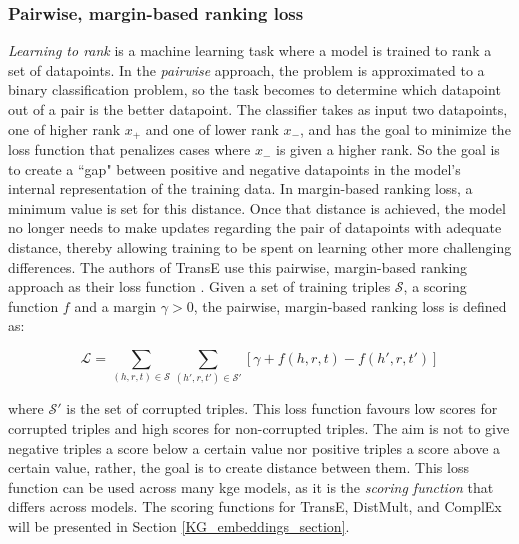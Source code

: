 \subsubsection{Pairwise, margin-based ranking loss}
\textit{Learning to rank} is a machine learning task where a model is trained to rank a set of datapoints. In the \textit{pairwise} approach, the problem is approximated to a binary classification problem, so the task becomes to determine which datapoint out of a pair is the better datapoint. The classifier takes as input two datapoints, one of higher rank $x_{+}$ and one of lower rank $x_{-}$, and has the goal to minimize the loss function that penalizes cases where $x_{-}$ is given a higher rank. So the goal is to create a ``gap" between positive and negative datapoints in the model's internal representation of the training data. In margin-based ranking loss, a minimum value is set for this distance. Once that distance is achieved, the model no longer needs to make updates regarding the pair of datapoints with adequate distance, thereby allowing training to be spent on learning other more challenging differences.  The authors of TransE use this pairwise, margin-based ranking approach as their loss function \cite{TransE}. Given a set of training triples $\mathcal{S}$, a scoring function $f$ and a margin $\gamma > 0$, the pairwise, margin-based ranking loss is defined as:

\[\mathcal{L}=\sum_{(h, r, t) \in \mathcal{S}}\sum_{(h', r, t') \in \mathcal{S'}}[\gamma + f(h, r, t) - f(h', r, t')]\]

where $\mathcal{S'}$ is the set of corrupted triples. This loss function favours low scores for corrupted triples and high scores for non-corrupted triples. The aim is not to give negative triples a score below a certain value nor positive triples a score above a certain value, rather, the goal is to create distance between them. This loss function can be used across many \gls{kge} models, as it is the \textit{scoring function} that differs across models. The scoring functions for TransE, DistMult, and ComplEx will be presented in Section \ref{KG_embeddings_section}.


